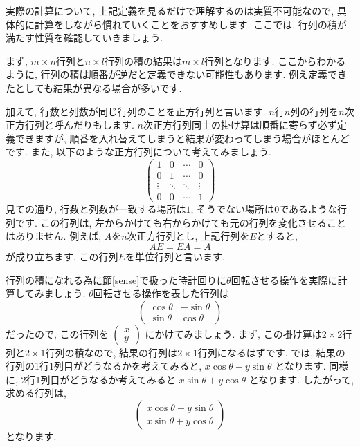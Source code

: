 \documentclass[a4paper,12pt]{jreport}
\theoremstyle{definition}
\begin{document}
   実際の計算について, 上記定義を見るだけで理解するのは実質不可能なので,
   具体的に計算をしながら慣れていくことをおすすめします.
   ここでは, 行列の積が満たす性質を確認していきましょう.

   まず, $m\times n$行列と$n\times l$行列の積の結果は$m\times l$行列となります.
   ここからわかるように, 行列の積は順番が逆だと定義できない可能性もあります.
   例え定義できたとしても結果が異なる場合が多いです.

   加えて, 行数と列数が同じ行列のことを正方行列と言います.
   $n$行$n$列の行列を$n$次正方行列と呼んだりもします.
   $n$次正方行列同士の掛け算は順番に寄らず必ず定義できますが, 順番を入れ替えてしまうと結果が変わってしまう場合がほとんどです.
   また, 以下のような正方行列について考えてみましょう.
   $$
   \begin{pmatrix}
      1 &0 &\cdots & 0\\
      0 & 1&\cdots & 0\\
      \vdots & \ddots& \ddots &\vdots\\
      0 & 0 & \cdots & 1
   \end{pmatrix}
   $$
   見ての通り, 行数と列数が一致する場所は$1$, そうでない場所は$0$であるような行列です.
   この行列は, 左からかけても右からかけても元の行列を変化させることはありません.
   例えば, $A$を$n$次正方行列とし, 上記行列を$E$とすると,
   $$
   AE=EA=A
   $$
   が成り立ちます.
   この行列$E$を単位行列と言います.

   行列の積になれる為に節\ref{sense}で扱った時計回りに$\theta$回転させる操作を実際に計算してみましょう.
   $\theta$回転させる操作を表した行列は
   $$
   \begin{pmatrix}
      \cos\theta &-\sin\theta\\
      \sin\theta &\cos\theta
   \end{pmatrix}
   $$
   だったので, この行列を
   $
   \begin{pmatrix}
      x\\
      y
   \end{pmatrix}
   $
   にかけてみましょう.
   まず, この掛け算は$2\times 2$行列と$2\times 1$行列の積なので, 結果の行列は$2\times 1$行列になるはずです.
   では, 結果の行列の1行1列目がどうなるかを考えてみると,
   $
   x\cos\theta-y\sin\theta
   $
   となります.
   同様に, 2行1列目がどうなるか考えてみると
   $
   x\sin\theta+y\cos\theta
   $
   となります.
   したがって, 求める行列は,
   $$
   \begin{pmatrix}
      x\cos\theta-y\sin\theta\\
      x\sin\theta+y\cos\theta
   \end{pmatrix}
   $$
   となります.
\end{document}
